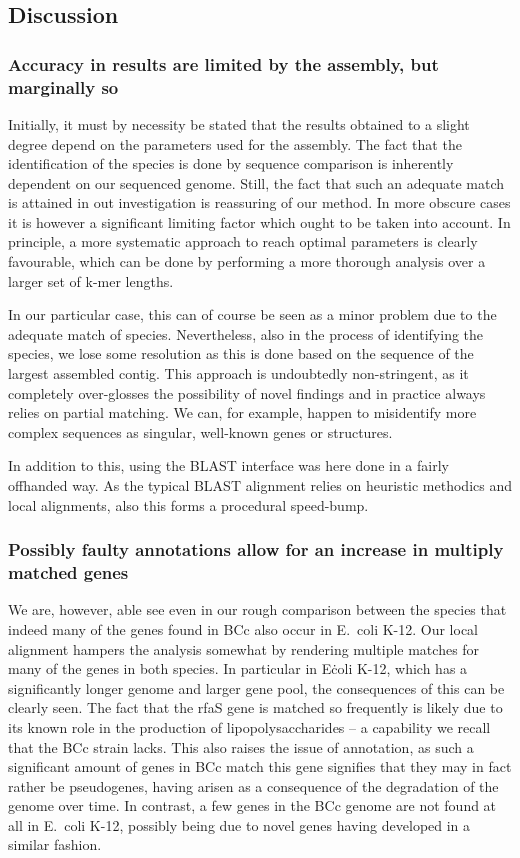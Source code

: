 \documentclass[10pt]{article}\usepackage[]{graphicx}\usepackage[]{color}
\theoremstyle{plain}
\theoremstyle{definition}
\begin{document}
\begin{multicols}{2}
\vspace{-1em}
\section{Discussion}
\subsubsection*{Accuracy in results are limited by the assembly, but marginally so}
Initially, it must by necessity be stated that the results obtained to a slight degree depend on the parameters used for the assembly. The fact that the identification of the species is done by sequence comparison is inherently dependent on our sequenced genome. Still, the fact that such an adequate match is attained in out investigation is reassuring of our method. In more obscure cases it is however a significant limiting factor which ought to be taken into account. In principle, a more systematic approach to reach optimal parameters is clearly favourable, which can be done by performing a more thorough analysis over a larger set of k-mer lengths.

In our particular case, this can of course be seen as a minor problem due to the adequate match of species. Nevertheless, also in the process of identifying the species, we lose some resolution as this is done based on the sequence of the largest assembled contig. This approach is undoubtedly non-stringent, as it completely over-glosses the possibility of novel findings and in practice always relies on partial matching. We can, for example, happen to misidentify more complex sequences as singular, well-known genes or structures. 

In addition to this, using the BLAST interface was here done in a fairly offhanded way. As the typical BLAST alignment relies on heuristic methodics and local alignments, also this forms a procedural speed-bump.

\subsubsection*{Possibly faulty annotations allow for an increase in multiply matched genes}
We are, however, able see even in our rough comparison between the species that indeed many of the genes found in BCc also occur in E.\ coli K-12. Our local alignment hampers the analysis somewhat by rendering multiple matches for many of the genes in both species. In particular in E\. coli K-12, which has a significantly longer genome and larger gene pool, the consequences of this can be clearly seen. The fact that the rfaS gene is matched so frequently is likely due to its known role in the production of lipopolysaccharides -- a capability we recall that the BCc strain lacks. This also raises the issue of annotation, as such a significant amount of genes in BCc match this gene signifies that they may in fact rather be pseudogenes, having arisen as a consequence of the degradation of the genome over time. In contrast, a few genes in the BCc genome are not found at all in E.\ coli K-12, possibly being due to novel genes having developed in a similar fashion.


\end{multicols}
\end{document}
